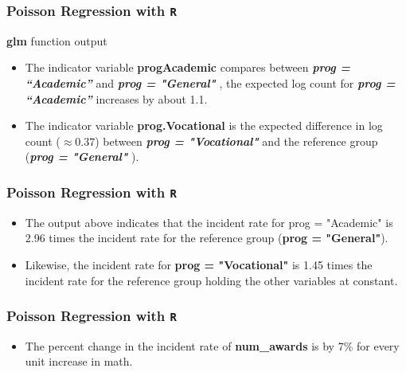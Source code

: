\documentclass[00-GLMregslides.tex]{subfiles}
\begin{document}
\begin{frame}[fragile]
\frametitle{Poisson Regression with \texttt{R}}
\Large 
\textbf{glm} function output
	\begin{itemize}

\item The indicator variable \textbf{progAcademic} compares between \textbf{\textit{prog = “Academic” }}and \textbf{\textit{prog = "General"}} , the expected log 
count for \textbf{\textit{prog = “Academic” }}increases by about 1.1. 
\item The indicator variable \textbf{prog.Vocational}  is the expected difference in log count (\(\approx 0.37\)) between 
\textbf{\textit{prog = "Vocational"}} and the reference group (\textbf{\textit{prog = "General"}} ).
\end{itemize}
\end{frame}
\begin{frame}[fragile]
	
	\frametitle{Poisson Regression with \texttt{R}}
	\Large 
	\begin{itemize}
		\item The output above indicates that the incident rate for prog = "Academic" is 2.96 times the incident rate for the reference group (\textbf{prog = "General"}). 
		\item Likewise, the incident rate for \textbf{prog = "Vocational"} is 1.45 times the incident rate for the reference group holding the other variables at constant. 
		
	\end{itemize}
	
\end{frame}
\begin{frame}[fragile]
	
	\frametitle{Poisson Regression with \texttt{R}}
	\Large 
	\begin{itemize}
		\item
		The percent change in the incident rate of \textbf{num\_awards} is by 7\% for every unit increase in math. 
	\end{itemize}
\end{frame}
\end{document}
